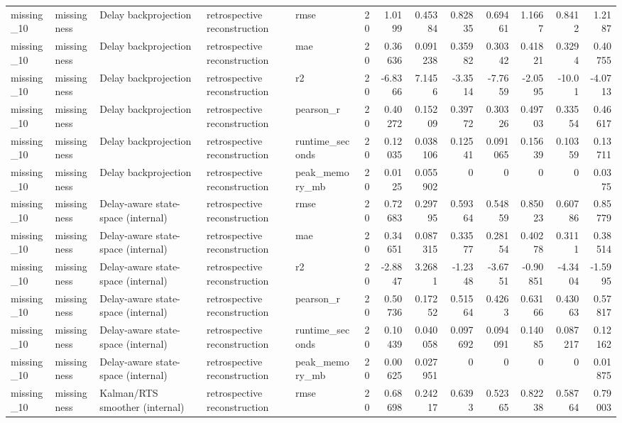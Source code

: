 \begin{table}[!htbp]
{{\begin{tabular}{lllllrrrrrrrr}
missing_10 & missingness & Delay backprojection & retrospective reconstruction & rmse & 20 & 1.0199 & 0.45384 & 0.82835 & 0.69461 & 1.1667 & 0.8412 & 1.2187 \\
missing_10 & missingness & Delay backprojection & retrospective reconstruction & mae & 20 & 0.36636 & 0.091238 & 0.35982 & 0.30342 & 0.41821 & 0.3294 & 0.40755 \\
missing_10 & missingness & Delay backprojection & retrospective reconstruction & r2 & 20 & -6.8366 & 7.1456 & -3.3514 & -7.7659 & -2.0595 & -10.01 & -4.0713 \\
missing_10 & missingness & Delay backprojection & retrospective reconstruction & pearson_r & 20 & 0.40272 & 0.15209 & 0.39772 & 0.30326 & 0.49703 & 0.33554 & 0.46617 \\
missing_10 & missingness & Delay backprojection & retrospective reconstruction & runtime_seconds & 20 & 0.12035 & 0.038106 & 0.12541 & 0.091065 & 0.15639 & 0.10359 & 0.13711 \\
missing_10 & missingness & Delay backprojection & retrospective reconstruction & peak_memory_mb & 20 & 0.0125 & 0.055902 & 0 & 0 & 0 & 0 & 0.0375 \\
missing_10 & missingness & Delay-aware state-space (internal) & retrospective reconstruction & rmse & 20 & 0.72683 & 0.29795 & 0.59364 & 0.54859 & 0.85023 & 0.60786 & 0.85779 \\
missing_10 & missingness & Delay-aware state-space (internal) & retrospective reconstruction & mae & 20 & 0.34651 & 0.087315 & 0.33577 & 0.28154 & 0.40278 & 0.3111 & 0.38514 \\
missing_10 & missingness & Delay-aware state-space (internal) & retrospective reconstruction & r2 & 20 & -2.8847 & 3.2681 & -1.2348 & -3.6751 & -0.90851 & -4.3404 & -1.5995 \\
missing_10 & missingness & Delay-aware state-space (internal) & retrospective reconstruction & pearson_r & 20 & 0.50736 & 0.17252 & 0.51564 & 0.4263 & 0.63166 & 0.43063 & 0.57817 \\
missing_10 & missingness & Delay-aware state-space (internal) & retrospective reconstruction & runtime_seconds & 20 & 0.10439 & 0.040058 & 0.097692 & 0.094091 & 0.14085 & 0.087217 & 0.12162 \\
missing_10 & missingness & Delay-aware state-space (internal) & retrospective reconstruction & peak_memory_mb & 20 & 0.00625 & 0.027951 & 0 & 0 & 0 & 0 & 0.01875 \\
missing_10 & missingness & Kalman/RTS smoother (internal) & retrospective reconstruction & rmse & 20 & 0.68698 & 0.24217 & 0.6393 & 0.52365 & 0.82238 & 0.58764 & 0.79003 \\

\end{tabular}}}
\end{table}
